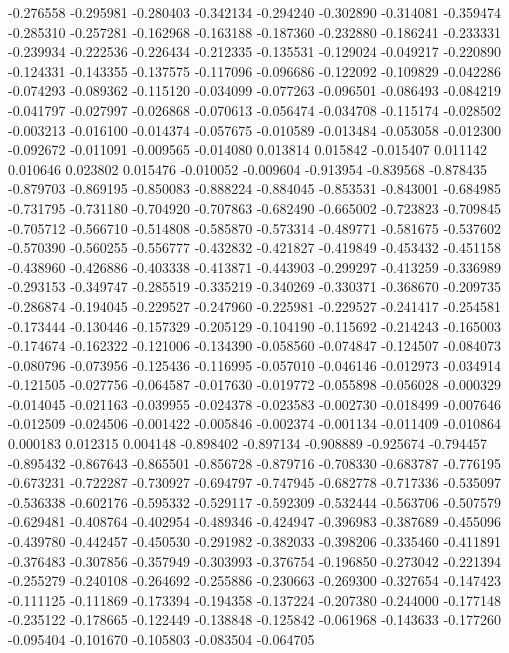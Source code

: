 -0.276558
-0.295981
-0.280403
-0.342134
-0.294240
-0.302890
-0.314081
-0.359474
-0.285310
-0.257281
-0.162968
-0.163188
-0.187360
-0.232880
-0.186241
-0.233331
-0.239934
-0.222536
-0.226434
-0.212335
-0.135531
-0.129024
-0.049217
-0.220890
-0.124331
-0.143355
-0.137575
-0.117096
-0.096686
-0.122092
-0.109829
-0.042286
-0.074293
-0.089362
-0.115120
-0.034099
-0.077263
-0.096501
-0.086493
-0.084219
-0.041797
-0.027997
-0.026868
-0.070613
-0.056474
-0.034708
-0.115174
-0.028502
-0.003213
-0.016100
-0.014374
-0.057675
-0.010589
-0.013484
-0.053058
-0.012300
-0.092672
-0.011091
-0.009565
-0.014080
0.013814
0.015842
-0.015407
0.011142
0.010646
0.023802
0.015476
-0.010052
-0.009604
-0.913954
-0.839568
-0.878435
-0.879703
-0.869195
-0.850083
-0.888224
-0.884045
-0.853531
-0.843001
-0.684985
-0.731795
-0.731180
-0.704920
-0.707863
-0.682490
-0.665002
-0.723823
-0.709845
-0.705712
-0.566710
-0.514808
-0.585870
-0.573314
-0.489771
-0.581675
-0.537602
-0.570390
-0.560255
-0.556777
-0.432832
-0.421827
-0.419849
-0.453432
-0.451158
-0.438960
-0.426886
-0.403338
-0.413871
-0.443903
-0.299297
-0.413259
-0.336989
-0.293153
-0.349747
-0.285519
-0.335219
-0.340269
-0.330371
-0.368670
-0.209735
-0.286874
-0.194045
-0.229527
-0.247960
-0.225981
-0.229527
-0.241417
-0.254581
-0.173444
-0.130446
-0.157329
-0.205129
-0.104190
-0.115692
-0.214243
-0.165003
-0.174674
-0.162322
-0.121006
-0.134390
-0.058560
-0.074847
-0.124507
-0.084073
-0.080796
-0.073956
-0.125436
-0.116995
-0.057010
-0.046146
-0.012973
-0.034914
-0.121505
-0.027756
-0.064587
-0.017630
-0.019772
-0.055898
-0.056028
-0.000329
-0.014045
-0.021163
-0.039955
-0.024378
-0.023583
-0.002730
-0.018499
-0.007646
-0.012509
-0.024506
-0.001422
-0.005846
-0.002374
-0.001134
-0.011409
-0.010864
0.000183
0.012315
0.004148
-0.898402
-0.897134
-0.908889
-0.925674
-0.794457
-0.895432
-0.867643
-0.865501
-0.856728
-0.879716
-0.708330
-0.683787
-0.776195
-0.673231
-0.722287
-0.730927
-0.694797
-0.747945
-0.682778
-0.717336
-0.535097
-0.536338
-0.602176
-0.595332
-0.529117
-0.592309
-0.532444
-0.563706
-0.507579
-0.629481
-0.408764
-0.402954
-0.489346
-0.424947
-0.396983
-0.387689
-0.455096
-0.439780
-0.442457
-0.450530
-0.291982
-0.382033
-0.398206
-0.335460
-0.411891
-0.376483
-0.307856
-0.357949
-0.303993
-0.376754
-0.196850
-0.273042
-0.221394
-0.255279
-0.240108
-0.264692
-0.255886
-0.230663
-0.269300
-0.327654
-0.147423
-0.111125
-0.111869
-0.173394
-0.194358
-0.137224
-0.207380
-0.244000
-0.177148
-0.235122
-0.178665
-0.122449
-0.138848
-0.125842
-0.061968
-0.143633
-0.177260
-0.095404
-0.101670
-0.105803
-0.083504
-0.064705
